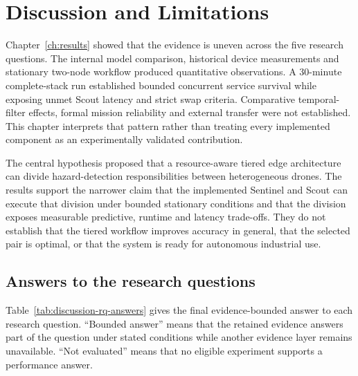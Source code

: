 \chapter{Discussion and Limitations}
\label{ch:discussion}

Chapter~\ref{ch:results} showed that the evidence is uneven across the five
research questions. The internal model comparison, historical device
measurements and stationary two-node workflow produced quantitative
observations. A 30-minute complete-stack run established bounded concurrent
service survival while exposing unmet Scout latency and strict swap criteria. Comparative
temporal-filter effects, formal mission reliability and external transfer were
not established.
This chapter interprets that pattern rather than treating every implemented
component as an experimentally validated contribution.

The central hypothesis proposed that a resource-aware tiered edge
architecture can divide hazard-detection responsibilities between heterogeneous
drones. The results support the narrower claim that the implemented Sentinel
and Scout can execute that division under bounded stationary conditions and
that the division exposes measurable predictive, runtime and latency
trade-offs. They do not establish that the tiered workflow improves accuracy in general,
that the selected pair is optimal, or that the system is ready for autonomous
industrial use.

\section{Answers to the research questions}
\label{sec:discussion:1}

Table~\ref{tab:discussion-rq-answers} gives the final evidence-bounded answer to
each research question. ``Bounded answer'' means that the retained evidence
answers part of the question under stated conditions while another evidence
layer remains unavailable. ``Not evaluated'' means that no eligible experiment
supports a performance answer.

